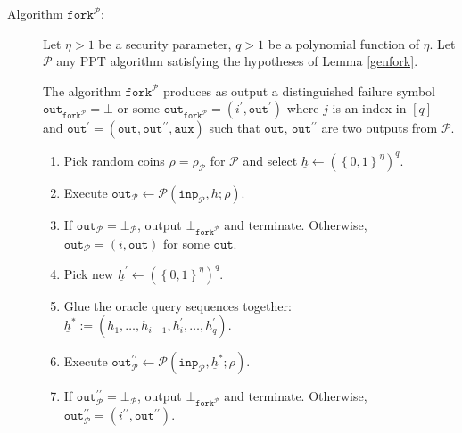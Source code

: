\documentclass{mrl}
\theoremstyle{definition}
\numberwithin{theorem}{subsection}
\begin{document}
\begin{description}
\item [Algorithm $\texttt{fork}^{\mathcal{P}}$:]  Let $\eta > 1$ be a security parameter, $q > 1$ be a polynomial function of $\eta$. Let $\mathcal{P}$ any PPT algorithm satisfying the hypotheses of Lemma \ref{genfork}. %


The algorithm $\texttt{fork}^{\mathcal{P}}$ produces as output a distinguished failure symbol $\texttt{out}_{\texttt{fork}^{\mathcal{P}}} = \bot$ or some $\texttt{out}_{\texttt{fork}^{\mathcal{P}}} = (i^\prime, \texttt{out}^\prime)$ where $j$ is an index in $[q]$ and $\texttt{out}^\prime = (\texttt{out}, \texttt{out}^{\prime\prime}, \texttt{aux})$ such that $\texttt{out}$, $\texttt{out}^{\prime\prime}$ are two outputs from $\mathcal{P}$. \begin{enumerate}
\item Pick random coins $\rho=\rho_\mathcal{P}$ for $\mathcal{P}$ and select $\underline{h} \leftarrow (\left\{0,1\right\}^{\eta})^q$.

\item Execute $\texttt{out}_\mathcal{P} \leftarrow \mathcal{P}(\texttt{inp}_{\mathcal{P}}, \underline{h};  \rho)$.

\item If $\texttt{out}_\mathcal{P} = \bot_\mathcal{P}$, output $\bot_{\texttt{fork}^{\mathcal{P}}}$ and terminate. Otherwise, $\texttt{out}_{\mathcal{P}} = (i, \texttt{out})$ for some $\texttt{out}$.

\item Pick new $\underline{h}^\prime \leftarrow (\left\{0,1\right\}^\eta)^q$.

\item Glue the oracle query sequences together: $\underline{h}^* := (h_1, \ldots, h_{i-1}, h^\prime_i, \ldots, h^\prime_q)$.

\item Execute $\texttt{out}_{\mathcal{P}}^{\prime \prime} \leftarrow \mathcal{P}(\texttt{inp}_{\mathcal{P}}, \underline{h}^*; \rho)$.

\item If $\texttt{out}_{\mathcal{P}}^{\prime \prime} = \bot_\mathcal{P}$, output $\bot_{\texttt{fork}^{\mathcal{P}}}$ and terminate. Otherwise, $\texttt{out}_{\mathcal{P}}^{\prime \prime} = (i^{\prime \prime}, \texttt{out}^{\prime \prime})$. 


\end{enumerate}
\end{description}
\end{document}

